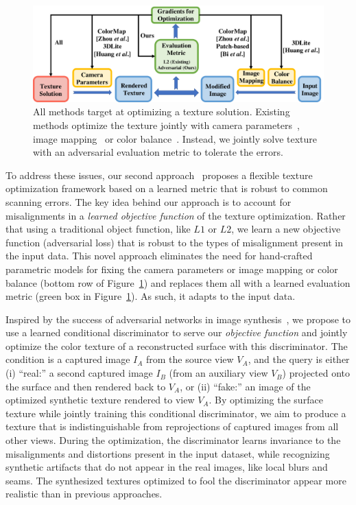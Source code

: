 \begin{figure}
    \centering
    \includegraphics[width=\linewidth]{texturegen/figures/concept.pdf}
    \caption{All methods target at optimizing a texture solution. Existing methods optimize the texture jointly with camera parameters~\cite{zhou2014color,huang20173dlite}, image mapping~\cite{zhou2014color,bi2017patch} or color balance~\cite{huang20173dlite}. Instead, we jointly solve texture with an adversarial evaluation metric to tolerate the errors.}
    \label{fig:toptim-concept}
\end{figure}
To address these issues, our second approach~\cite{huang2020adversarial} proposes a flexible texture optimization framework based on a learned metric that is robust to common scanning errors.
 The key idea behind our approach is to account for misalignments in a {\em learned objective function} of the texture optimization.   
 Rather that using a traditional object function, like $L1$ or $L2$, we learn a new objective function (adversarial loss) that is robust to the types of misalignment present in the input data.  This novel approach eliminates the need for hand-crafted parametric models for fixing the camera parameters \cite{zhou2014color,huang20173dlite} or image mapping \cite{bi2017patch,zhou2014color} or color balance \cite{huang20173dlite} (bottom row of Figure~\ref{fig:toptim-concept}) and replaces them all with a learned evaluation metric (green box in Figure~\ref{fig:toptim-concept}).   As such, it adapts to the input data.
 
Inspired by the success of adversarial networks in image synthesis~\cite{goodfellow2014generative}, we propose to use a learned conditional discriminator to serve our {\em objective function} and jointly optimize the color texture of a reconstructed surface with this discriminator.
The condition is a captured image $I_A$ from the source view $V_A$, and the query is either (i) ``real:'' a second captured image $I_B$ (from an auxiliary view $V_B$) projected onto the surface and then rendered back to $V_A$, or (ii) ``fake:'' an image of the optimized synthetic texture rendered to view $V_A$. By optimizing the surface texture while jointly training this conditional discriminator, we aim to produce a texture that is indistinguishable from reprojections of captured images from all other views.  
%
During the optimization, the discriminator learns invariance to the misalignments and distortions present in the input dataset, while recognizing synthetic artifacts that do not appear in the real images, like local blurs and seams.  The synthesized textures optimized to fool the discriminator appear more realistic than in previous approaches.

